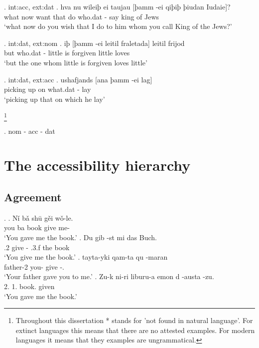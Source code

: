 \ex. \ac{int}:\ac{acc}, \ac{ext}:\ac{dat}
\ag. hva nu wileiþ ei taujau [þamm -ei qiþiþ þiudan Iudaie]?\\
 what now want that do\scsub{[dat]} who.\ac{dat} - say\scsub{[acc]} king {of Jews}\\
 `what now do you wish that I do to him whom you call King of the Jews?' 

\ex. \ac{int}:\ac{dat}, \ac{ext}:\ac{nom}
\ag. iþ [þamm -ei leitil fraletada] leitil frijod\\
 but who.\ac{dat} - little {is forgiven\scsub{[dat]}} little loves\scsub{[nom]}\\
 `but the one whom little is forgiven loves little' 

\ex. \ac{int}:\ac{dat}, \ac{ext}:\ac{acc}
\ag. ushafjands [ana þamm -ei lag]\\
 {picking up}\scsub{[acc]} on\scsub{[dat]} what.\ac{dat} - lay\\
 `picking up that on which he lay' 


\footnote{Throughout this dissertation * stands for 'not found in natural language'. For extinct languages this means that there are no attested examples. For modern languages it means that they examples are ungrammatical.}



\ex. \ac{nom} - \ac{acc} - \ac{dat}

\phantom{nom}



\section{The accessibility hierarchy}

\subsection{Agreement}

\ex.
\ag. Nǐ bǎ shū gěi wǒ-le.\\
 you ba book give me-\\
 `You gave me the book.' 
\bg. Du gib -st mi das Buch.\\
 .2 give - .3.f the book\\
 `You give me the book.' 
\bg. tayta-yki qam-ta qu -maran\\
 father-2 you- give -.\\
 `Your father gave you to me.' 
\bg. Zu-k ni-ri liburu-a emon d -austa -zu.\\
 2. 1. book. given   \\
 `You gave me the book.' 

